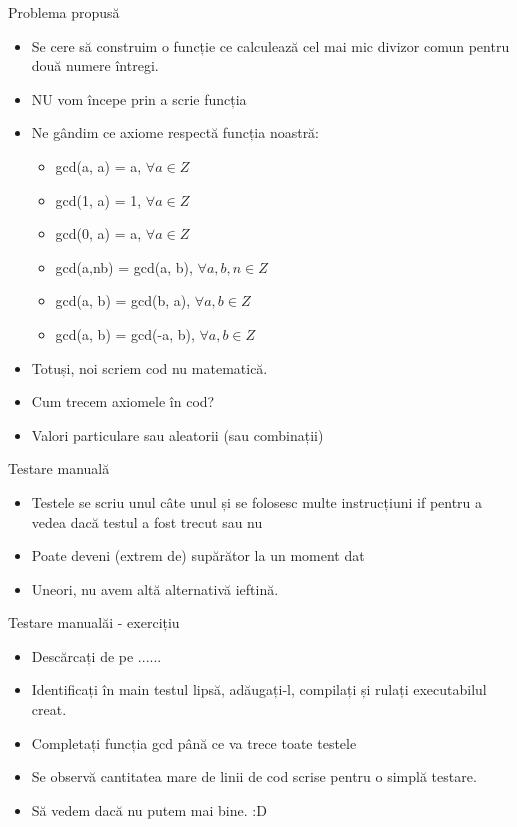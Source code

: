 \documentclass{beamer}
\begin{document}
\begin{frame}{Problema propusă}
\begin{itemize}
\item Se cere să construim o funcție ce calculează cel mai mic divizor comun pentru două numere întregi.
\item \pause NU vom începe prin a scrie funcția
\item \pause Ne gândim ce axiome respectă funcția noastră:
\begin{itemize}
\item \pause gcd(a, a) = a, $\forall a \in Z$
\item gcd(1, a) = 1, $\forall a \in Z$
\item gcd(0, a) = a, $\forall a \in Z$
\item gcd(a,nb) = gcd(a, b), $\forall a,b,n \in Z$
\item gcd(a, b) = gcd(b, a), $\forall a,b \in Z$
\item gcd(a, b) = gcd(-a, b), $\forall a,b \in Z$
\end{itemize}
\item \pause Totuși, noi scriem cod nu matematică.
\item \pause Cum trecem axiomele în cod?
\item \pause Valori particulare sau aleatorii (sau combinații)
\end{itemize}
\end{frame}

\begin{frame}{Testare manuală}
\begin{itemize}
\item Testele se scriu unul câte unul și se folosesc multe instrucțiuni if pentru a vedea dacă testul a fost trecut sau nu
\item \pause Poate deveni (extrem de) supărător la un moment dat
\item \pause Uneori, nu avem altă alternativă ieftină.
\end{itemize}
\end{frame}

\begin{frame}{Testare manualăi - exercițiu}
\begin{itemize}
\item Descărcați de pe ......
\item Identificați în main testul lipsă, adăugați-l, compilați și rulați executabilul creat.
\item \pause Completați funcția gcd până ce va trece toate testele
\item \pause Se observă cantitatea mare de linii de cod scrise pentru o simplă testare.
\item \pause Să vedem dacă nu putem mai bine. :D
\end{itemize}
\end{frame}
\end{document}
